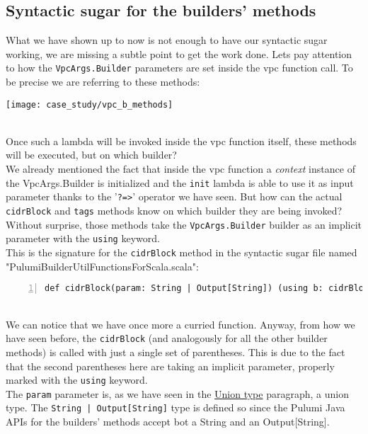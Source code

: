 \subsection{Syntactic sugar for the builders' methods}
\label{ssec:syn-sug-builders}
What we have shown up to now is not enough to have our syntactic sugar working, we are missing a subtle point to get the work done.
Lets pay attention to how the \texttt{VpcArgs.Builder} parameters are set inside the vpc function call.
To be precise we are referring to these methods:
\begin{center}
  \texttt{[image: case\_study/vpc\_b\_methods]} 
\end{center}\mbox{}\\
Once such a lambda will be invoked inside the vpc function itself, these methods will be executed, but on which builder?\\
We already mentioned the fact that inside the vpc function a \textit{context} instance of the VpcArgs.Builder is initialized and the \texttt{init} lambda is able to use it as input parameter thanks to the '\texttt{?=>}' operator we have seen.
But how can the actual \texttt{cidrBlock} and \texttt{tags} methods know on which builder they are being invoked?\\
Without surprise, those methods take the \texttt{VpcArgs.Builder} builder as an implicit parameter with the \texttt{using} keyword.\\
This is the signature for the \texttt{cidrBlock} method in the syntactic sugar file named "PulumiBuilderUtilFunctionsForScala.scala":
\begin{lstlisting}[numbers=left, numberstyle=\tiny, numbersep=-5pt, stepnumber=1, linewidth=420pt]
  def cidrBlock(param: String | Output[String]) (using b: cidrBlockOwners): Unit
\end{lstlisting}\mbox{}\\
We can notice that we have once more a curried function.
Anyway, from how we have seen before, the \texttt{cidrBlock} (and analogously for all the other builder methods) is called with just a single set of parentheses.
This is due to the fact that the second parentheses here are taking an implicit parameter, properly marked with the \texttt{using} keyword.\\
The \texttt{param} parameter is, as we have seen in the \hyperref[sssec:union]{Union type} paragraph, a union type.
The \texttt{String | Output[String]} type is defined so since the Pulumi Java APIs for the builders' methods accept bot a String and an Output[String].
